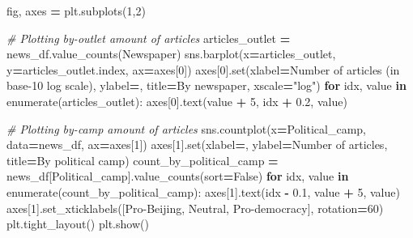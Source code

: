 \documentclass[a4paper, oneside]{report}
\newenvironment{Shaded}{\begin{snugshade}}{\end{snugshade}}
\newcommand{\BuiltInTok}[1]{#1}
\newcommand{\CommentTok}[1]{\textcolor[rgb]{0.56,0.35,0.01}{\textit{#1}}}
\newcommand{\ControlFlowTok}[1]{\textcolor[rgb]{0.13,0.29,0.53}{\textbf{#1}}}
\newcommand{\DecValTok}[1]{\textcolor[rgb]{0.00,0.00,0.81}{#1}}
\newcommand{\FloatTok}[1]{\textcolor[rgb]{0.00,0.00,0.81}{#1}}
\newcommand{\KeywordTok}[1]{\textcolor[rgb]{0.13,0.29,0.53}{\textbf{#1}}}
\newcommand{\NormalTok}[1]{#1}
\newcommand{\OperatorTok}[1]{\textcolor[rgb]{0.81,0.36,0.00}{\textbf{#1}}}
\newcommand{\StringTok}[1]{\textcolor[rgb]{0.31,0.60,0.02}{#1}}
\newcommand{\VariableTok}[1]{\textcolor[rgb]{0.00,0.00,0.00}{#1}}
\renewenvironment{Shaded}
{
  \vspace{4pt}%
  \begin{snugshade}%
}{%
  \end{snugshade}%
  \vspace{4pt}%
}
\begin{document}
\begin{Shaded}
\begin{Highlighting}[]
\NormalTok{fig, axes }\OperatorTok{=}\NormalTok{ plt.subplots(}\DecValTok{1}\NormalTok{,}\DecValTok{2}\NormalTok{)}

\CommentTok{\# Plotting by{-}outlet amount of articles}
\NormalTok{articles\_outlet }\OperatorTok{=}\NormalTok{ news\_df.value\_counts(}\StringTok{\textquotesingle{}Newspaper\textquotesingle{}}\NormalTok{)}
\NormalTok{sns.barplot(x}\OperatorTok{=}\NormalTok{articles\_outlet, y}\OperatorTok{=}\NormalTok{articles\_outlet.index, ax}\OperatorTok{=}\NormalTok{axes[}\DecValTok{0}\NormalTok{])}
\NormalTok{axes[}\DecValTok{0}\NormalTok{].}\BuiltInTok{set}\NormalTok{(xlabel}\OperatorTok{=}\StringTok{\textquotesingle{}Number of articles (in base{-}10 log scale)\textquotesingle{}}\NormalTok{, ylabel}\OperatorTok{=}\StringTok{\textquotesingle{}\textquotesingle{}}\NormalTok{, title}\OperatorTok{=}\StringTok{\textquotesingle{}By newspaper\textquotesingle{}}\NormalTok{, xscale}\OperatorTok{=}\StringTok{"log"}\NormalTok{)}
\ControlFlowTok{for}\NormalTok{ idx, value }\KeywordTok{in} \BuiltInTok{enumerate}\NormalTok{(articles\_outlet):}
\NormalTok{    axes[}\DecValTok{0}\NormalTok{].text(value }\OperatorTok{+} \DecValTok{5}\NormalTok{, idx }\OperatorTok{+} \FloatTok{0.2}\NormalTok{, value)}

\CommentTok{\# Plotting by{-}camp amount of articles}
\NormalTok{sns.countplot(x}\OperatorTok{=}\StringTok{\textquotesingle{}Political\_camp\textquotesingle{}}\NormalTok{, data}\OperatorTok{=}\NormalTok{news\_df, ax}\OperatorTok{=}\NormalTok{axes[}\DecValTok{1}\NormalTok{])    }
\NormalTok{axes[}\DecValTok{1}\NormalTok{].}\BuiltInTok{set}\NormalTok{(xlabel}\OperatorTok{=}\StringTok{\textquotesingle{}\textquotesingle{}}\NormalTok{, ylabel}\OperatorTok{=}\StringTok{\textquotesingle{}Number of articles\textquotesingle{}}\NormalTok{, title}\OperatorTok{=}\StringTok{\textquotesingle{}By political camp\textquotesingle{}}\NormalTok{)}
\NormalTok{count\_by\_political\_camp }\OperatorTok{=}\NormalTok{ news\_df[}\StringTok{\textquotesingle{}Political\_camp\textquotesingle{}}\NormalTok{].value\_counts(sort}\OperatorTok{=}\VariableTok{False}\NormalTok{)}
\ControlFlowTok{for}\NormalTok{ idx, value }\KeywordTok{in} \BuiltInTok{enumerate}\NormalTok{(count\_by\_political\_camp):}
\NormalTok{  axes[}\DecValTok{1}\NormalTok{].text(idx }\OperatorTok{{-}} \FloatTok{0.1}\NormalTok{, value }\OperatorTok{+} \DecValTok{5}\NormalTok{, value)}
\NormalTok{axes[}\DecValTok{1}\NormalTok{].set\_xticklabels([}\StringTok{\textquotesingle{}Pro{-}Beijing\textquotesingle{}}\NormalTok{, }\StringTok{\textquotesingle{}Neutral\textquotesingle{}}\NormalTok{, }\StringTok{\textquotesingle{}Pro{-}democracy\textquotesingle{}}\NormalTok{], rotation}\OperatorTok{=}\DecValTok{60}\NormalTok{)}
\NormalTok{plt.tight\_layout()}
\NormalTok{plt.show()}
\end{Highlighting}
\end{Shaded}
\end{document}
